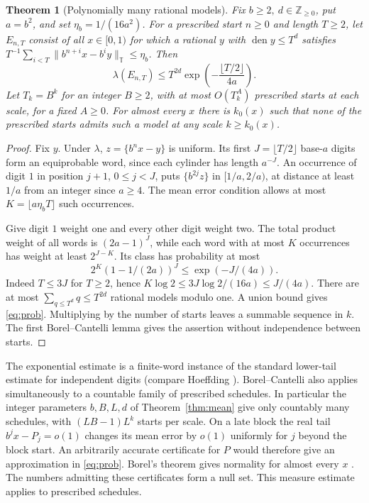 \documentclass[11pt]{article}
\newtheorem{theorem}{Theorem}
\newcommand{\Z}{\mathbb Z}
\newcommand{\T}{\mathbb T}
\newcommand{\circabs}[1]{\lVert #1\rVert_{\T}}
\DeclareMathOperator{\den}{den}
\begin{document}
\begin{theorem}[Polynomially many rational models]\label{thm:count}
Fix \(b\ge2,\ d\in\Z_{\ge0}\), put \(a=b^2\), and set \(\eta_b=1/(16a^2)\). For a prescribed start \(n\ge0\) and length \(T\ge2\), let \(E_{n,T}\) consist of all \(x\in[0,1)\) for which a rational \(y\) with \(\den y\le T^d\) satisfies \(T^{-1}\sum_{i<T}\circabs{b^{n+i}x-b^iy}\le\eta_b\). Then
\begin{equation}\label{eq:prob}
 \lambda(E_{n,T})\le T^{2d}\exp\!\left(-\frac{\lfloor T/2\rfloor}{4a}\right).
\end{equation}
Let \(T_k=B^k\) for an integer \(B\ge2\), with at most \(O(T_k^A)\) prescribed starts at each scale, for a fixed \(A\ge0\). For almost every \(x\) there is \(k_0(x)\) such that none of the prescribed starts admits such a model at any scale \(k\ge k_0(x)\).
\end{theorem}
\begin{proof}
Fix \(y\). Under \(\lambda\), \(z=\{b^n x-y\}\) is uniform. Its first \(J=\lfloor T/2\rfloor\) base-\(a\) digits form an equiprobable word, since each cylinder has length \(a^{-J}\). An occurrence of digit \(1\) in position \(j+1\), \(0\le j<J\), puts \(\{b^{2j}z\}\) in \([1/a,2/a)\), at distance at least \(1/a\) from an integer since \(a\ge4\). The mean error condition allows at most \(K=\lfloor a\eta_b T\rfloor\) such occurrences.

Give digit \(1\) weight one and every other digit weight two. The total product weight of all words is \((2a-1)^J\), while each word with at most \(K\) occurrences has weight at least \(2^{J-K}\). Its class has probability at most
\[
 2^K(1-1/(2a))^J \le \exp(-J/(4a)).
\]
Indeed \(T\le3J\) for \(T\ge2\), hence \(K\log2\le 3J\log2/(16a)\le J/(4a)\). There are at most \(\sum_{q\le T^d}q\le T^{2d}\) rational models modulo one. A union bound gives \eqref{eq:prob}. Multiplying by the number of starts leaves a summable sequence in \(k\). The first Borel--Cantelli lemma gives the assertion without independence between starts.
\end{proof}
The exponential estimate is a finite-word instance of the standard lower-tail estimate for independent digits (compare Hoeffding \cite{hoeffding}). Borel--Cantelli also applies simultaneously to a countable family of prescribed schedules. In particular the integer parameters \(b,B,L,d\) of Theorem~\ref{thm:mean} give only countably many schedules, with \((LB-1)L^k\) starts per scale. On a late block the real tail \(b^jx-P_j=o(1)\) changes its mean error by \(o(1)\) uniformly for \(j\) beyond the block start. An arbitrarily accurate certificate for \(P\) would therefore give an approximation in \eqref{eq:prob}. Borel's theorem gives normality for almost every \(x\) \cite{borel}. The numbers admitting these certificates form a null set. This measure estimate applies to prescribed schedules.
\end{document}
